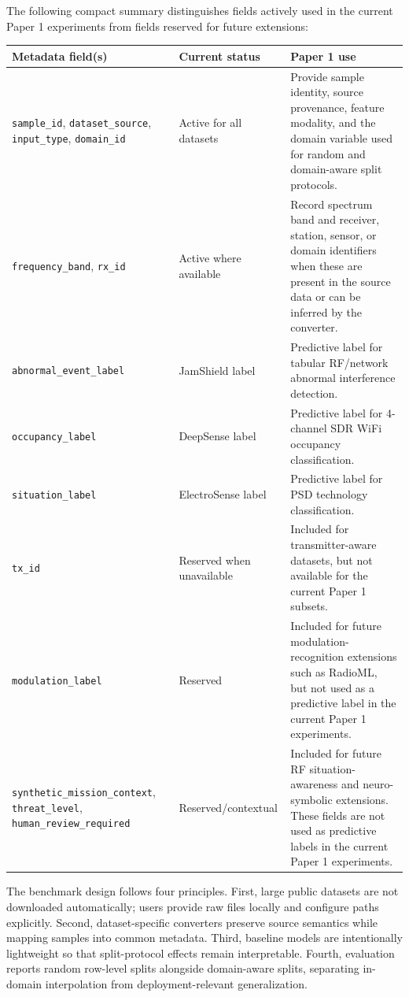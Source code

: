 \documentclass[11pt]{article}
\newcommand{\artifact}[1]{\texttt{#1}}
\begin{document}
The following compact summary distinguishes fields actively used in the current Paper 1 experiments from fields reserved for future extensions:
\begin{center}
\scriptsize
\setlength{\tabcolsep}{3pt}
\renewcommand{\arraystretch}{1.14}
\begin{tabularx}{0.96\textwidth}{L{0.25\textwidth} L{0.18\textwidth} Y}
  \toprule
  Metadata field(s) & Current status & Paper 1 use \\
  \midrule
  \artifact{sample\_id}, \artifact{dataset\_source}, \artifact{input\_type}, \artifact{domain\_id} & Active for all datasets & Provide sample identity, source provenance, feature modality, and the domain variable used for random and domain-aware split protocols. \\
  \artifact{frequency\_band}, \artifact{rx\_id} & Active where available & Record spectrum band and receiver, station, sensor, or domain identifiers when these are present in the source data or can be inferred by the converter. \\
  \artifact{abnormal\_event\_label} & JamShield label & Predictive label for tabular RF/network abnormal interference detection. \\
  \artifact{occupancy\_label} & DeepSense label & Predictive label for 4-channel SDR WiFi occupancy classification. \\
  \artifact{situation\_label} & ElectroSense label & Predictive label for PSD technology classification. \\
  \artifact{tx\_id} & Reserved when unavailable & Included for transmitter-aware datasets, but not available for the current Paper 1 subsets. \\
  \artifact{modulation\_label} & Reserved & Included for future modulation-recognition extensions such as RadioML, but not used as a predictive label in the current Paper 1 experiments. \\
  \artifact{synthetic\_mission\_context}, \artifact{threat\_level}, \artifact{human\_review\_required} & Reserved/contextual & Included for future RF situation-awareness and neuro-symbolic extensions. These fields are not used as predictive labels in the current Paper 1 experiments. \\
  \bottomrule
\end{tabularx}
\end{center}

The benchmark design follows four principles. First, large public datasets are not downloaded automatically; users provide raw files locally and configure paths explicitly. Second, dataset-specific converters preserve source semantics while mapping samples into common metadata. Third, baseline models are intentionally lightweight so that split-protocol effects remain interpretable. Fourth, evaluation reports random row-level splits alongside domain-aware splits, separating in-domain interpolation from deployment-relevant generalization.
\end{document}
